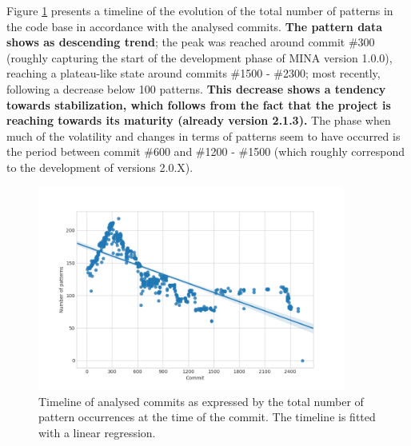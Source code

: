 Figure \ref{fig:commit_timeline} presents a timeline of the evolution of the total number of patterns in the code base in accordance with the analysed commits. \textbf{The pattern data shows as descending trend}; the peak was reached around commit \#300 (roughly capturing the start of the development phase of MINA version 1.0.0), reaching a plateau-like state around commits \#1500 - \#2300; most recently, following a decrease below 100 patterns. \textbf{This decrease shows a tendency towards stabilization, which follows from the fact that the project is reaching towards its maturity (already version 2.1.3).} The phase when much of the volatility and changes in terms of patterns seem to have occurred is the period between commit \#600 and \#1200 - \#1500 (which roughly correspond to the development of versions 2.0.X).  

\begin{figure}[H]
    \centering
    \includegraphics[width =0.9\textwidth]{images/graphs/commit_timeline.png}
    \caption{Timeline of analysed commits as expressed by the total number of pattern occurrences at the time of the commit. The timeline is fitted with a linear regression.}
    \label{fig:commit_timeline}
\end{figure}

